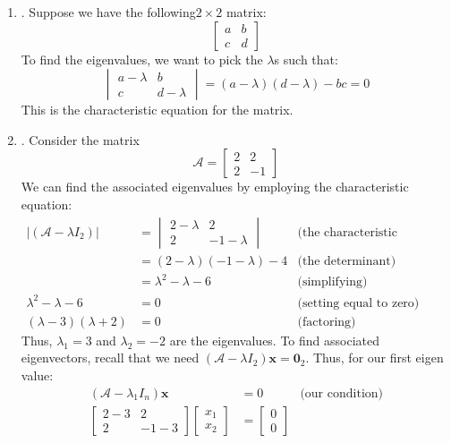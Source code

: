 \documentclass[12pt]{article}
\begin{document}
\begin{enumerate}
\begin{enumerate}
	\item\underline{}.
		Suppose we have the following$2\times 2$ matrix:
			\[\begin{bmatrix}a&b\\c&d\end{bmatrix}\]
		To find the eigenvalues, we want to pick the $\lambda$s such that:
			\[\begin{vmatrix}a-\lambda & b \\ c & d-\lambda\end{vmatrix}=(a-\lambda)(d-\lambda)-bc =0\]
		This is the characteristic equation for the matrix.

	\item\underline{}.
		Consider the matrix
			\[\mathcal{A}=\begin{bmatrix}2 & 2 \\ 2 & -1\end{bmatrix}\]
		We can find the associated eigenvalues by employing the characteristic equation:
		\begin{align*}
			|(\mathcal{A}-\lambda I_2)|&=\begin{vmatrix}2-\lambda & 2 \\ 2 & -1 -\lambda\end{vmatrix}
					&\text{(the characteristic equation)}\\[5pt]
			&=(2-\lambda)(-1-\lambda)-4
					&\text{(the determinant)}\\[5pt]
			&=\lambda^2-\lambda-6
					&\text{(simplifying)}\\[5pt]
			\lambda^2-\lambda-6&=0
					&\text{(setting equal to zero)}\\[5pt]
			(\lambda-3)(\lambda+2)&=0 &\text{(factoring)}
		\end{align*}
		Thus, $\lambda_1=3$ and $\lambda_2=-2$ are the eigenvalues. To find associated eigenvectors, recall that we need
		$(\mathcal{A}-\lambda I_2)\mathbf{x}=\mathbf{0}_2$. Thus, for our first eigen value:
		\begin{align*}
			(\mathcal{A}-\lambda_1 I_n)\mathbf{x} & = 0
					&\text{(our condition)}\\[5pt]
			\begin{bmatrix}2-3 & 2 \\ 2 & -1 -3\end{bmatrix}\begin{bmatrix}x_1 \\ x_2\end{bmatrix}
				&=\begin{bmatrix}0 \\ 0\end{bmatrix}

\end{align*}
\end{enumerate}
\end{enumerate}
\end{document}
